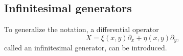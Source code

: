 \subsection{Infinitesimal generators}

To generalize the notation, a differential operator
\begin{equation}
  X = \xi(x,y) \partial_x + \eta(x,y) \partial_y,
\end{equation}
called an infinitesimal generator, can be introduced.